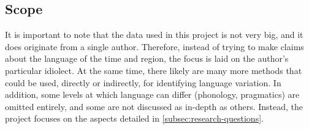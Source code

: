 \subsection{Scope}
\label{subsec:scope}

It is important to note that the data used in this project is not very big, and it does originate from a single author. Therefore, instead of trying to make claims about the language of the time and region, the focus is laid on the author's particular idiolect. At the same time, there likely are many more methods that could be used, directly or indirectly, for identifying language variation. In addition, some levels at which language can differ (phonology, pragmatics) are omitted entirely, and some are not discussed as in-depth as others. Instead, the project focuses on the aspects detailed in \autoref{subsec:research-questions}.